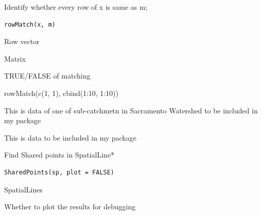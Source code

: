\documentclass[a4paper]{book}
\begin{document}
%
\begin{Description}\relax
Identify whether every row of x is same as m;
\end{Description}
%
\begin{Usage}
\begin{verbatim}
rowMatch(x, m)
\end{verbatim}
\end{Usage}
%
\begin{Arguments}
\begin{ldescription}
\item[\code{x}] Row vector

\item[\code{m}] Matrix
\end{ldescription}
\end{Arguments}
%
\begin{Value}
TRUE/FALSE of matching
\end{Value}
%
\begin{Examples}
\begin{ExampleCode}
rowMatch(c(1, 1), cbind(1:10, 1:10))
\end{ExampleCode}
\end{Examples}
%
\begin{Description}\relax
This is data of one of sub-catchmetn in Sacramento Watershed  to be included in my package
\end{Description}
%
\begin{Description}\relax
This is data to be included in my package
\end{Description}
%
\begin{Description}\relax
Find Shared points in SpatialLine*
\end{Description}
%
\begin{Usage}
\begin{verbatim}
SharedPoints(sp, plot = FALSE)
\end{verbatim}
\end{Usage}
%
\begin{Arguments}
\begin{ldescription}
\item[\code{sp}] SpatialLines

\item[\code{plot}] Whether to plot the results for debugging
\end{ldescription}
\end{Arguments}
\end{document}

